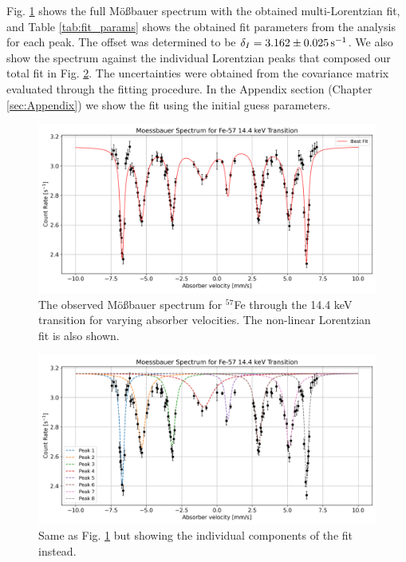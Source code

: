 \documentclass[a4paper]{report}
\numberwithin{equation}{section}
\begin{document}
Fig. \ref{fig:moess_spect} shows the full M\"o{\ss}bauer spectrum with the obtained multi-Lorentzian fit, and Table \ref{tab:fit_params} shows the obtained fit parameters from the analysis for each peak.
The offset was determined to be $\delta_I = \SI{3.162 \pm 0.025}{\per\second} $. We also show the spectrum against the individual Lorentzian
peaks that composed our total fit in Fig. \ref{fig:moess_spect_comps}. The uncertainties were obtained from the 
covariance matrix evaluated through the fitting procedure. In the Appendix section (Chapter \ref{sec:Appendix}) we show the fit using the initial guess parameters. \par 

\begin{figure}[htb!]
	\centering
	\includegraphics[width=0.8\columnwidth]{moess_spect.png}
	\caption{The observed M\"o{\ss}bauer spectrum for $^{57}$Fe through the 14.4 keV transition for varying absorber velocities. The 
	non-linear Lorentzian fit is also shown.}
	\label{fig:moess_spect}
\end{figure}

\begin{figure}[htb!]
	\centering
	\includegraphics[width=0.8\columnwidth]{moess_spect_comps.png}
	\caption{Same as Fig. \ref{fig:moess_spect} but showing the individual components of the fit instead.}
	\label{fig:moess_spect_comps}
\end{figure}
\end{document}
